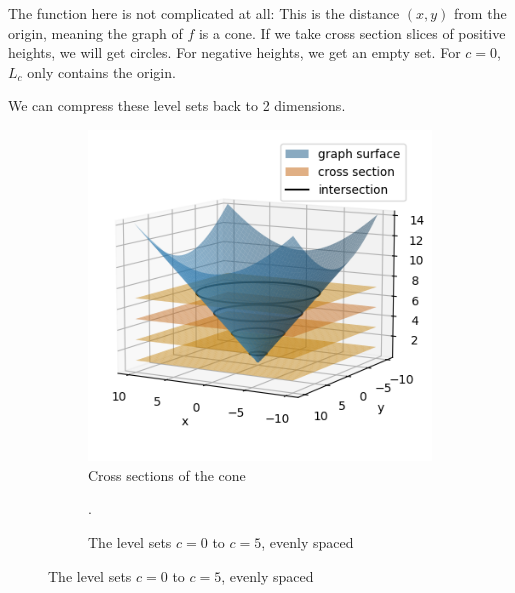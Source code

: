 The function here is not complicated at all: This is the distance $(x,y)$ from the origin, meaning the graph of $f$ is a cone. If we take cross section slices of positive heights, we will get circles. For negative heights, we get an empty set. For $c=0$, $L_c$ only contains the origin.

We can compress these level sets back to 2 dimensions.
\begin{figure}[h]
    \centering
    \begin{subfigure}[l]{0.46\textwidth}
    \centering
    \includegraphics[width=\textwidth]{Rn_function/cone.png}
    \caption{Cross sections of the cone}
    \end{subfigure}
    \begin{subfigure}[r]{0.5\textwidth} 
        \centering
{}
\caption{The level sets $c=0$ to $c=5$, evenly spaced}.
    \end{subfigure}
\end{figure}


